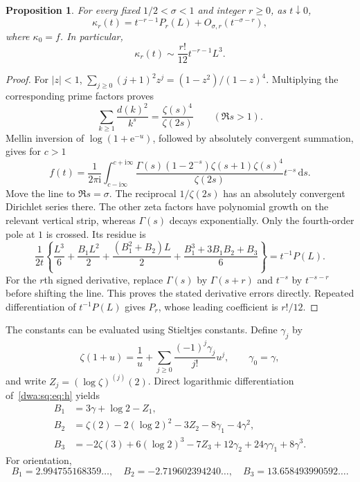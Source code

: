 \documentclass[11pt,letterpaper]{article}
\numberwithin{equation}{section}
\newtheorem{proposition}[theorem]{Proposition}
\theoremstyle{remark}
\newcommand{\dd}{\mathrm d}
\newcommand{\e}{\mathrm e}
\newcommand{\ii}{\mathrm i}
\begin{document}
\begin{proposition}\label{dwa:sq:prop:Mellin}
For every fixed $1/2<\sigma<1$ and integer $r\ge0$, as $t\downarrow0$,
\begin{equation}\label{dwa:sq:eq:cumulant-poly}
 \kappa_r(t)=t^{-r-1}P_r(L)+O_{\sigma,r}(t^{-\sigma-r}),
\end{equation}
where $\kappa_0=f$. In particular,
\begin{equation}\label{dwa:sq:eq:cumulant-leading}
 \kappa_r(t)\sim\frac{r!}{12}t^{-r-1}L^3.
\end{equation}
\end{proposition}
\begin{proof}
For $|z|<1$, $\sum_{j\ge0}(j+1)^2z^j=(1-z^2)/(1-z)^4$. Multiplying the corresponding prime factors proves
\[
 \sum_{k\ge1}\frac{d(k)^2}{k^s}=\frac{\zeta(s)^4}{\zeta(2s)}
 \qquad(\Re s>1).
\]
Mellin inversion of $\log(1+\e^{-u})$, followed by absolutely convergent summation, gives for $c>1$
\begin{equation}\label{dwa:sq:eq:Mellin}
 f(t)=\frac1{2\pi\ii}\int_{c-\ii\infty}^{c+\ii\infty}
 \frac{\Gamma(s)(1-2^{-s})\zeta(s+1)\zeta(s)^4}{\zeta(2s)}t^{-s}\,\dd s.
\end{equation}
Move the line to $\Re s=\sigma$. The reciprocal $1/\zeta(2s)$ has an absolutely convergent Dirichlet series there. The other zeta factors have polynomial growth on the relevant vertical strip, whereas $\Gamma(s)$ decays exponentially. Only the fourth-order pole at $1$ is crossed. Its residue is
\[
 \frac1{2t}\left\{\frac{L^3}{6}+\frac{B_1L^2}{2}
 +\frac{(B_1^2+B_2)L}{2}+\frac{B_1^3+3B_1B_2+B_3}{6}\right\}
 =t^{-1}P(L).
\]
For the $r$th signed derivative, replace $\Gamma(s)$ by $\Gamma(s+r)$ and $t^{-s}$ by $t^{-s-r}$ before shifting the line. This proves the stated derivative errors directly. Repeated differentiation of $t^{-1}P(L)$ gives $P_r$, whose leading coefficient is $r!/12$.
\end{proof}

The constants can be evaluated using Stieltjes constants. Define $\gamma_j$ by
\[
 \zeta(1+u)=\frac1u+\sum_{j\ge0}\frac{(-1)^j\gamma_j}{j!}u^j,
 \qquad \gamma_0=\gamma,
\]
and write $Z_j=(\log\zeta)^{(j)}(2)$. Direct logarithmic differentiation of~\eqref{dwa:sq:eq:h} yields
\begin{align}
 B_1&=3\gamma+\log2-Z_1,\label{dwa:sq:eq:B1}\\
 B_2&=\zeta(2)-2(\log2)^2-3Z_2-8\gamma_1-4\gamma^2,\label{dwa:sq:eq:B2}\\
 B_3&=-2\zeta(3)+6(\log2)^3-7Z_3
       +12\gamma_2+24\gamma\gamma_1+8\gamma^3.\label{dwa:sq:eq:B3}
\end{align}
For orientation,
\[
 B_1=2.994755168359\ldots,\quad
 B_2=-2.719602394240\ldots,\quad B_3=13.658493990592\ldots.
\]
\end{document}
